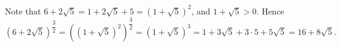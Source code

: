 Note that $6+2\sqrt5=1+2\sqrt5+5=\left(1+\sqrt5\right)^2$, and $1+\sqrt5>0$. Hence
\[\left(6+2\sqrt5\right)^{\dfrac32}=\left(\left(1+\sqrt5\right)^2\right)^{\dfrac32}=\left(1+\sqrt5\right)^3=1+3\sqrt5+3\cdot5+5\sqrt5=\boxed{16+8\sqrt5}.\]
